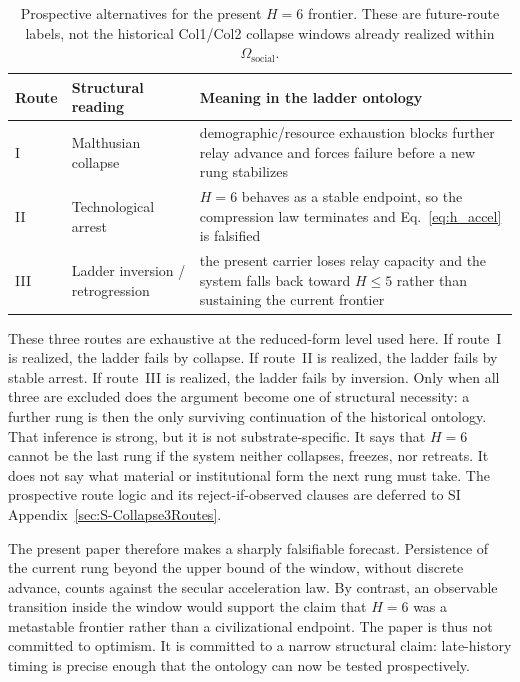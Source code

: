 \documentclass[11pt]{article}
\begin{document}
\begin{table}[htbp]
\centering
\caption{
Prospective alternatives for the present \(H{=}6\) frontier.
These are future-route labels,
not the historical Col1/Col2 collapse windows already realized within
\(\Omega_{\mathrm{social}}\).
}
\label{tab:forecast_routes}
\begin{tabular}{p{2.3cm}p{4.1cm}p{7.0cm}}
\toprule
Route & Structural reading & Meaning in the ladder ontology \\
\midrule
I & Malthusian collapse & demographic/resource exhaustion blocks further relay advance and forces failure before a new rung stabilizes \\
II & Technological arrest & \(H{=}6\) behaves as a stable endpoint, so the compression law terminates and Eq.~\eqref{eq:h_accel} is falsified \\
III & Ladder inversion / retrogression & the present carrier loses relay capacity and the system falls back toward \(H\le 5\) rather than sustaining the current frontier \\
\bottomrule
\end{tabular}
\end{table}

These three routes are exhaustive at the reduced-form level used here.
If route~I is realized,
the ladder fails by collapse.
If route~II is realized,
the ladder fails by stable arrest.
If route~III is realized,
the ladder fails by inversion.
Only when all three are excluded does the argument become one of structural necessity:
a further rung is then the only surviving continuation of the historical ontology.
That inference is strong,
but it is not substrate-specific.
It says that \(H{=}6\) cannot be the last rung if the system neither collapses,
freezes,
nor retreats.
It does not say what material or institutional form the next rung must take.
The prospective route logic and its reject-if-observed clauses are deferred to SI Appendix~\ref{sec:S-Collapse3Routes}.

The present paper therefore makes a sharply falsifiable forecast.
Persistence of the current rung beyond the upper bound of the window,
without discrete advance,
counts against the secular acceleration law.
By contrast,
an observable transition inside the window would support the claim that
\(H{=}6\)
was a metastable frontier rather than a civilizational endpoint.
The paper is thus not committed to optimism.
It is committed to a narrow structural claim:
late-history timing is precise enough that the ontology can now be tested prospectively.
\end{document}
